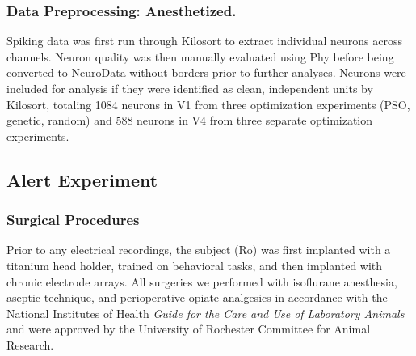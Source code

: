 \subsubsection*{Data Preprocessing: Anesthetized.}
Spiking data was first run through Kilosort \parencite{Steinmetz2021} to extract individual neurons across channels. Neuron quality was then manually evaluated using Phy before being converted to NeuroData without borders prior to further analyses. Neurons were included for analysis if they were identified as clean, independent units by Kilosort, totaling 1084 neurons in V1 from three optimization experiments (PSO, genetic, random) and 588 neurons in V4 from three separate optimization experiments. 


\subsection{Alert Experiment}

\subsubsection*{Surgical Procedures}
Prior to any electrical recordings, the subject (Ro) was first implanted with a titanium head holder, trained on behavioral tasks, and then implanted with chronic electrode arrays. All surgeries we performed with isoflurane anesthesia, aseptic technique, and perioperative opiate analgesics in accordance with the National Institutes of Health \textit{Guide for the Care and Use of Laboratory Animals} and were approved by the University of Rochester Committee for Animal Research.

